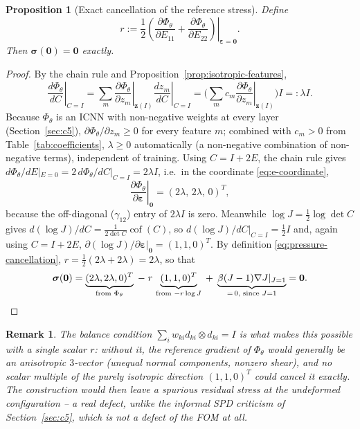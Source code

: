 \documentclass[10pt,a4paper]{article}
\newtheorem{proposition}{Proposition}
\newtheorem{remark}{Remark}
\newcommand{\Cof}{\operatorname{cof}}
\begin{document}
\begin{proposition}[Exact cancellation of the reference stress]
\label{prop:cancellation}
Define
\begin{equation}
 r:=\frac12\left.\left(\frac{\partial\Phi_\theta}{\partial E_{11}}+
 \frac{\partial\Phi_\theta}{\partial E_{22}}\right)\right|_{\bm\varepsilon=\bm0}.
 \label{eq:pressure-cancellation}
\end{equation}
Then $\bm\sigma(\bm0)=\bm0$ exactly.
\end{proposition}
\begin{proof}
By the chain rule and Proposition~\ref{prop:isotropic-features},
\begin{equation}
 \left.\frac{d\Phi_\theta}{dC}\right|_{C=I}
 =\sum_m\left.\frac{\partial\Phi_\theta}{\partial z_m}\right|_{\bm z(I)}
 \left.\frac{dz_m}{dC}\right|_{C=I}
 =\Big(\sum_mc_m\left.\frac{\partial\Phi_\theta}{\partial z_m}\right|_{\bm z(I)}\Big)I
 =:\lambda I .
 \label{eq:lambda}
\end{equation}
Because $\Phi_\theta$ is an ICNN with non-negative weights at every layer
(Section~\ref{sec:c5}), $\partial\Phi_\theta/\partial z_m\geq0$ for every
feature $m$; combined with $c_m>0$ from Table~\ref{tab:coefficients},
$\lambda\geq0$ automatically (a non-negative combination of non-negative
terms), independent of training.  Using $C=I+2E$, the chain rule gives
$d\Phi_\theta/dE|_{E=0}=2\,d\Phi_\theta/dC|_{C=I}=2\lambda I$, i.e.\ in the
coordinate \eqref{eq:e-coordinate},
\begin{equation}
 \left.\frac{\partial\Phi_\theta}{\partial\bm\varepsilon}\right|_{\bm0}
 =(2\lambda,\,2\lambda,\,0)^T,
\end{equation}
because the off-diagonal ($\gamma_{12}$) entry of $2\lambda I$ is zero.
Meanwhile $\log J=\tfrac12\log\det C$ gives $d(\log J)/dC=\tfrac1{2\det
C}\Cof(C)$, so $d(\log J)/dC|_{C=I}=\tfrac12I$ and, again using $C=I+2E$,
$\partial(\log J)/\partial\bm\varepsilon|_{\bm0}=(1,1,0)^T$.  By definition
\eqref{eq:pressure-cancellation}, $r=\tfrac12(2\lambda+2\lambda)=2\lambda$,
so that
\begin{equation}
 \bm\sigma(\bm0)=\underbrace{(2\lambda,2\lambda,0)^T}_{\text{from }\Phi_\theta}
 \;-\;r\,\underbrace{(1,1,0)^T}_{\text{from }-r\log J}
 \;+\;\underbrace{\beta(J-1)\nabla J|_{J=1}}_{=\,0\text{, since }J=1}
 =\bm0. \qedhere
\end{equation}
\end{proof}
\begin{remark}
The balance condition $\sum_iw_{ki}d_{ki}\otimes d_{ki}=I$ is what makes
this possible with a \emph{single} scalar $r$: without it, the reference
gradient of $\Phi_\theta$ would generally be an anisotropic $3$-vector
(unequal normal components, nonzero shear), and no scalar multiple of the
purely isotropic direction $(1,1,0)^T$ could cancel it exactly. The
construction would then leave a spurious residual stress at the
undeformed configuration -- a real defect, unlike the informal SPD
criticism of Section~\ref{sec:c5}, which is not a defect of the FOM at
all.
\end{remark}
\end{document}
